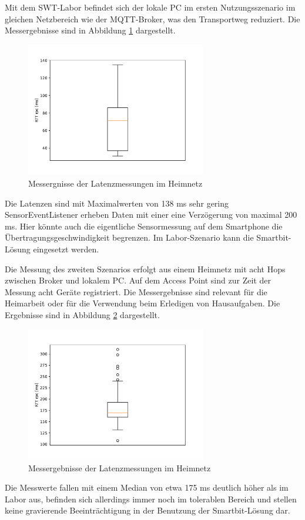 \documentclass[11pt,a4paper]{report}
\begin{document}
Mit dem SWT-Labor befindet sich der lokale PC im ersten Nutzungsszenario im gleichen Netzbereich wie der MQTT-Broker, was den Transportweg reduziert.
Die Messergebnisse sind in Abbildung \ref{fig:measure_institute} dargestellt.
\begin{figure}[htbp]
  \centering
  \includegraphics[width=0.7\textwidth]{images/timing_institute.pdf}
  \caption{Messergnisse der Latenzmessungen im Heimnetz}
  \label{fig:measure_institute}
\end{figure}
Die Latenzen sind mit Maximalwerten von 138 ms sehr gering  
SensorEventListener erheben Daten mit einer eine Verzögerung von maximal 200 ms.
Hier könnte auch die eigentliche Sensormessung auf dem Smartphone die Übertragungsgeschwindigkeit begrenzen.
Im Labor-Szenario kann die Smartbit-Lösung eingesetzt werden.

Die Messung des zweiten Szenarios erfolgt aus einem Heimnetz mit acht Hops zwischen Broker und lokalem PC. 
Auf dem Access Point sind zur Zeit der Messung acht Geräte registriert.
Die Messergebnisse sind relevant für die Heimarbeit oder für die Verwendung beim Erledigen von Hausaufgaben.
Die Ergebnisse sind in Abbildung \ref{fig:measure_home} dargestellt.
\begin{figure}[htbp]
  \centering
  \includegraphics[width=0.7\textwidth]{images/timing_at_home}
  \caption{Messergebnisse der Latenzmessungen im Heimnetz}
  \label{fig:measure_home}
\end{figure}
Die Messwerte fallen mit einem Median von etwa 175 ms deutlich höher als im Labor aus, befinden sich allerdings immer noch im tolerablen Bereich und stellen keine gravierende Beeinträchtigung in der Benutzung der Smartbit-Lösung dar.
\end{document}
